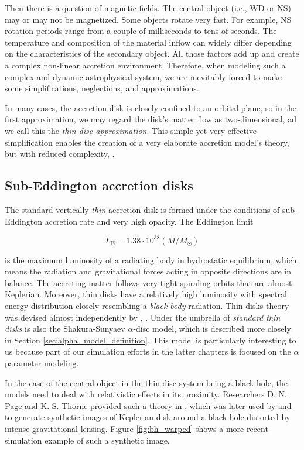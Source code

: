     Then there is a question of magnetic fields. The central object (i.e., WD or NS) may or may not be magnetized. Some objects rotate very fast. For example, NS rotation periods range from a couple of milliseconds to tens of seconds. The temperature and composition of the material inflow can widely differ depending on the characteristics of the secondary object. All those factors add up and create a complex non-linear accretion environment. Therefore, when modeling such a complex and dynamic astrophysical system, we are inevitably forced to make some simplifications, neglections, and approximations. 

    In many cases, the accretion disk is closely confined to an orbital plane, so in the first approximation, we may regard the disk's matter flow as two-dimensional, ad we call this the \emph{thin disc approximation}. This simple yet very effective simplification enables the creation of a very elaborate accretion model's theory, but with reduced complexity, \citep{acpow}.

\subsection{Sub-Eddington accretion disks}
    The standard vertically \emph{thin} accretion disk is formed under the conditions of sub-Eddington accretion rate and very high opacity. The Eddington limit
    
    \begin{equation}
        L_{\mathrm{E}} = 1.38 \cdot 10^{38} (M / M_{\odot}) 
    \end{equation}

    is the maximum luminosity of a radiating body in hydrostatic equilibrium, which means the radiation and gravitational forces acting in opposite directions are in balance. The accreting matter follows very tight spiraling orbits that are almost Keplerian. Moreover, thin disks have a relatively high luminosity with spectral energy distribution closely resembling a \emph{black body} radiation. Thin disks theory was devised almost independently by \citep{lyndenbell1974}, \citep{pringle1981}. Under the umbrella of \emph{standard thin disks} is also the Shakura-Sunyaev $\alpha$-disc model, which is described more closely in Section \ref{sec:alpha_model_definition}. This model is particularly interesting to us because part of our simulation efforts in the latter chapters is focused on the $\alpha$ parameter modeling.

    In the case of the central object in the thin disc system being a black hole, the models need to deal with relativistic effects in its proximity. Researchers D. N. Page and K. S. Thorne provided such a theory in \citep{page1974}, which was later used by \citep{luminet1979} and \citep{marck1996} to generate synthetic images of Keplerian disk around a black hole distorted by intense gravitational lensing. Figure \ref{fig:bh_warped} shows a more recent simulation example of such a synthetic image. 

